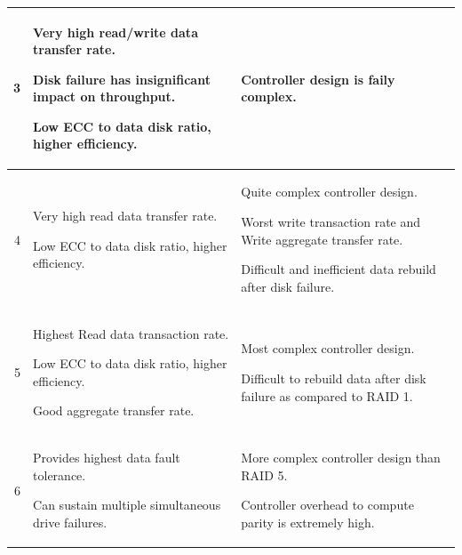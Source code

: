 \begin{table}[H]
\begin{tabularx}{\textwidth}{|r|*{2}{>{\RaggedRight\arraybackslash}X|}}
        3 &

        Very high read/write data transfer rate. \par
        Disk failure has insignificant impact on throughput. \par
        Low ECC to data disk ratio, higher efficiency.

        &

        Controller design is faily complex.
        
        \\ \hline

        4 &

        Very high read data transfer rate. \par
        Low ECC to data disk ratio, higher efficiency.

        &

        Quite complex controller design. \par
        Worst write transaction rate and Write aggregate transfer rate. \par
        Difficult and inefficient data rebuild after disk failure.

        \\ \hline

        5 &

        Highest Read data transaction rate. \par
        Low ECC to data disk ratio, higher efficiency. \par
        Good aggregate transfer rate.

        &

        Most complex controller design. \par
        Difficult to rebuild data after disk failure as compared to RAID 1.

        \\ \hline

        6 &

        Provides highest data fault tolerance. \par
        Can sustain multiple simultaneous drive failures.

        &

        More complex controller design than RAID 5. \par
        Controller overhead to compute parity is extremely high.

        \\ \hline
        
    \end{tabularx}
\end{table}

